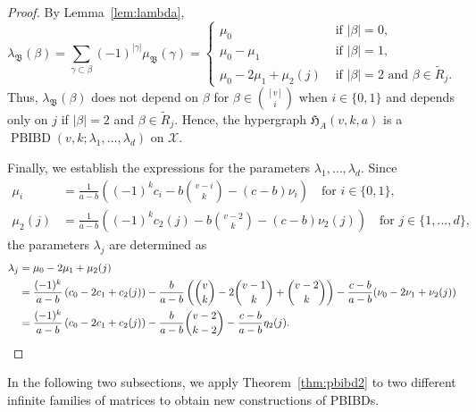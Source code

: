 \documentclass[11pt]{article}
\begin{document}
\begin{proof}
By Lemma~\ref{lem:lambda},
$$
\lambda_\mathfrak B(\beta)=\sum_{\gamma\subset \beta}(-1)^{|\gamma|}\mu_\mathfrak B(\gamma)=\begin{cases}\mu_0 & \text{ if }|\beta|=0,\\
\mu_0-\mu_1 & \text{ if }|\beta|=1,\\
\mu_0-2\mu_1+\mu_{2}(j) & \text{ if }|\beta|=2\text{ and }\beta\in \tilde{R}_j.
\end{cases} 
$$
Thus, $\lambda_\mathfrak B(\beta)$ does not depend on $\beta$ for $\beta \in \binom{[v]}{i}$ when $i\in\{0,1\}$ and depends only on $j$  if $|\beta|=2$ and $\beta\in \tilde{R}_j$.  
Hence, the hypergraph $\mathfrak H_{A}(v,k,a)$ 
is a $\operatorname{PBIBD}(v,k;\lambda_1,\ldots,\lambda_d)$ on $\mathcal{X}$.

Finally, we establish the expressions for the parameters $\lambda_1,\ldots,\lambda_d$.  
Since 
\begin{align*}
\mu_i&=\frac{1}{a-b}\left((-1)^{k} c_{i}-b\binom{v-i}{k}-(c-b)\nu_{i}\right)\quad\text{for $i\in \{0,1\}$},\\  
\mu_{2}(j)&=\frac{1}{a-b}\left((-1)^{k} c_{2}(j)-b\binom{v-2}{k}-(c-b)\nu_{2}(j)\right)\quad\text{for $j\in \{1,\dots,d\}$},   
\end{align*}
the parameters $\lambda_j$ are determined as 
\begin{align*}
\lambda_j&=\mu_0-2\mu_1+\mu_{2}(j)\\
    &=\frac{(-1)^k}{a-b}\left(c_0-2c_1+c_{2}(j)\right)-\frac{b}{a-b}\left( \binom{v}{k} - 2\binom{v-1}{k}+\binom{v-2}{k}\right)-\frac{c-b}{a-b}(\nu_{0}-2\nu_1+\nu_2(j))\\
    &=\frac{(-1)^k}{a-b}\left(c_0-2c_1+c_{2}(j)\right)-\frac{b}{a-b}\binom{v-2}{k-2}-\frac{c-b}{a-b}\eta_2(j).\qedhere
\end{align*}
\end{proof}

In the following two subsections, we apply Theorem~\ref{thm:pbibd2} to two different infinite families of matrices to obtain new constructions of PBIBDs.
\end{document}
